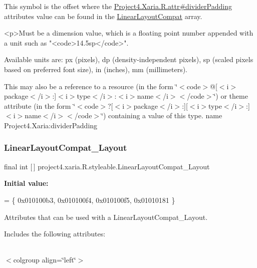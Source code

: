 This symbol is the offset where the \hyperlink{}{Project4.\+Xaria.\+R.\+attr\#divider\+Padding} attribute\textquotesingle{}s value can be found in the \hyperlink{classproject4_1_1xaria_1_1R_1_1styleable_a7f929bdf7d740d51fa83ce463e56c432}{Linear\+Layout\+Compat} array.

\begin{DoxyVerb}      <p>Must be a dimension value, which is a floating point number appended with a unit such as "<code>14.5sp</code>".
\end{DoxyVerb}
 Available units are\+: px (pixels), dp (density-\/independent pixels), sp (scaled pixels based on preferred font size), in (inches), mm (millimeters). 

This may also be a reference to a resource (in the form \char`\"{}$<$code$>$@\mbox{[}$<$i$>$package$<$/i$>$\+:\mbox{]}$<$i$>$type$<$/i$>$\+:$<$i$>$name$<$/i$>$$<$/code$>$\char`\"{}) or theme attribute (in the form \char`\"{}$<$code$>$?\mbox{[}$<$i$>$package$<$/i$>$\+:\mbox{]}\mbox{[}$<$i$>$type$<$/i$>$\+:\mbox{]}$<$i$>$name$<$/i$>$$<$/code$>$\char`\"{}) containing a value of this type.  name Project4.\+Xaria\+:divider\+Padding \mbox{\label{classproject4_1_1xaria_1_1R_1_1styleable_abae4849d55752ff5e7c774316d11a406}} 
\subsubsection{\texorpdfstring{Linear\+Layout\+Compat\+\_\+\+Layout}{LinearLayoutCompat\_Layout}}
{\footnotesize\ttfamily final int \mbox{[}$\,$\mbox{]} project4.\+xaria.\+R.\+styleable.\+Linear\+Layout\+Compat\+\_\+\+Layout\hspace{0.3cm}{\ttfamily [static]}}

{\bfseries Initial value\+:}
\begin{DoxyCode}
= \{
            0x010100b3, 0x010100f4, 0x010100f5, 0x01010181
        \}
\end{DoxyCode}
Attributes that can be used with a Linear\+Layout\+Compat\+\_\+\+Layout. 

Includes the following attributes\+:

\tabulinesep=1mm
\begin{longtabu} spread 0pt [c]{*{0}{|X[-1]}|}
\hline
\end{longtabu}
$<$colgroup align=\char`\"{}left\char`\"{}$>$ 

